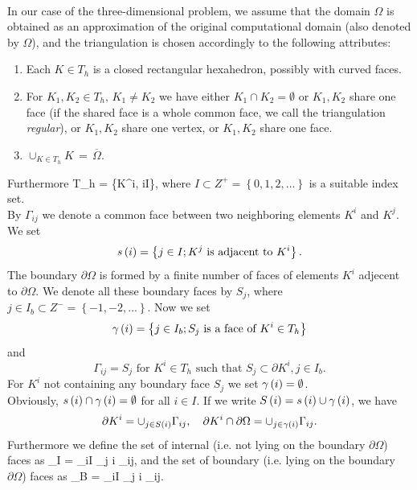 \paragraph{}
In our case of the three-dimensional problem, we assume that the domain $\Omega$ is obtained as an approximation of the original computational domain (also denoted by $\Omega$), and the triangulation is chosen accordingly to the following attributes:
\renewcommand{\labelenumi}{\Alph{enumi})}
\begin{enumerate}
    \item Each $K\in T_h$ is a closed rectangular hexahedron, possibly with curved faces.
    \item For $K_1,K_2\in T_h,\,K_1\neq{K}_2$ we have either $K_1\cap{K}_2 = \emptyset$ or $K_1,K_2$ share one face (if the shared face is a whole common face, we call the triangulation \emph{regular}), or $K_1,K_2$ share one vertex, or $K_1,K_2$ share one face.
    \item$\cup_{K\in T_h}K\,=\,\overline{\Omega}.$
\end{enumerate}
Furthermore
\be
\label{Idef}  T_h = \left\{K^i, i\in I\right\},
\ee
where $I\subset Z^+ = \left\{0, 1, 2, ...\right\}$ is a suitable index set.\\
By $\Gamma_{ij}$ we denote a common face between two
neighboring elements $K^i$ and $K^j$. We set 
$$s
\left( i\right) = \left\{j\in I; K^j \text{ is adjacent to } K^i\right\}.
$$
The boundary $\partial\Omega$ is formed by a finite number of faces of elements $K^i$ adjecent to
$\partial\Omega$. We denote all these boundary faces by $S_j$, where $j\in I_b\subset Z^{-} = \left\{-1, -2, ...\right\}$.
Now we set 
$$
\gamma\left( i \right) = \left\{j\in I_b; S_j \text{ is a face of } K^i\in T_h\right\}
$$ 
and 
$$
\Gamma_{ij} = S_j\text{ for } K^i\in  T_h\text{ such that }S_j\subset\partial K^i, j\in I_b.
$$
For $K^i$ not containing any boundary face $S_j$ we set $\gamma\left( i \right) = \emptyset$.\\
Obviously, $s\left( i \right) \cap\gamma\left( i\right) = \emptyset$ for all $i\in I$. If we write $S\left( i \right) = s \left( i\right) \cup \gamma\left( i \right)$, we have
$$
\partial K^i = \cup_{j\in S\left( i \right)}\Gamma_{ij},\ \ \ \partial K^i\cap\partial{\Omega} = \cup_{j\in\gamma\left( i \right)}\Gamma_{ij}.
$$
Furthermore we define the set of internal (i.e. not lying on the boundary $\partial\Omega$) faces as
\be
\label{InternalEdges} \Gamma_I = \cup_{i\in I} \cup_{j \notin \gamma\lo i \ro} \Gamma_{ij},
\ee
and the set of boundary (i.e. lying on the boundary $\partial\Omega$) faces as
\be
\label{BndEdges} \Gamma_B = \cup_{i\in I} \cup_{j \in \gamma\lo i \ro} \Gamma_{ij}.
\ee

